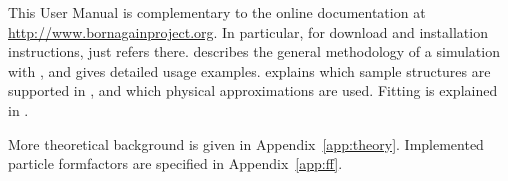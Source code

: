 This User Manual is complementary to the online documentation
at \url{http://www.bornagainproject.org}.
In particular, for download and installation instructions,
 just refers there.
 describes
the general methodology of a simulation with \BornAgain,
and gives detailed usage examples.
 explains
which sample structures are supported in \BornAgain,
and which physical approximations are used.
Fitting is explained in .

More theoretical background is given in Appendix~\ref{app:theory}.
Implemented particle formfactors are specified in Appendix~\ref{app:ff}.

